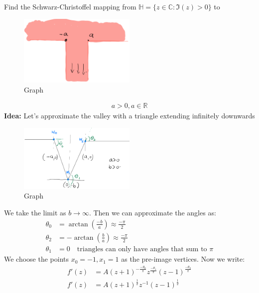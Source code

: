 \begin{example}
    Find the Schwarz-Christoffel mapping from $\mathbb{H} = \{z \in \mathbb{C} : \Im(z) > 0\}$ to
    \begin{figure}[H]
        \centering
        \includegraphics[width=0.5\textwidth]{LECTURE_18/graph2.png}
        \caption{Graph}
    \end{figure}
    \begin{align}
        a > 0, a \in \mathbb{R}
    \end{align}
    \textbf{Idea:} Let's approximate the valley with a triangle extending infinitely downwards
    \begin{figure}[H]
        \centering
        \includegraphics[width=0.5\textwidth]{LECTURE_18/graph3.png}
        \caption{Graph}
    \end{figure}
    We take the limit as $b \rightarrow \infty$. Then we can approximate the angles as:
    \begin{align}
        \theta_0 & = \arctan (\frac{-b}{a}) \approx \frac{-\pi}{2}                  \\
        \theta_2 & = - \arctan(\frac{b}{a}) \approx \frac{-\pi}{2}                  \\
        \theta_1 & = 0 \quad \text{triangles can only have angles that sum to } \pi
    \end{align}
    We choose the points $x_0 = -1, x_1 = 1$ as the pre-image vertices. Now we write:
    \begin{align}
        f'(z) & = A (z + 1)^{-\frac{-\theta_0}\pi}z^{\frac{-\theta_1}\pi} (z - 1)^{\frac{-\theta_2}\pi} \\
        f'(z) & = A (z + 1)^{\frac{1}{2}}z^{-1} (z - 1)^{\frac{1}{2}}                                   \\

\end{align}
\end{example}
